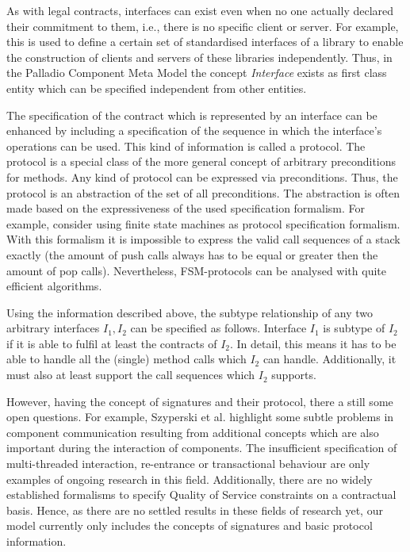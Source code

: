 As with legal contracts, interfaces can exist even when no one actually declared their commitment to them, i.e., there is no specific client or server. For example, this is used to define a certain set of standardised interfaces of a library to enable the construction of clients and servers of these libraries independently. Thus, in the Palladio Component Meta Model the concept \emph{Interface} exists as first class entity which can be specified independent from other entities.


The specification of the contract which is represented by an interface can be enhanced by including a specification of the sequence in which the interface's operations can be used. This kind of information is called a protocol. The protocol is a special class of the more general concept of arbitrary preconditions for methods. Any kind of protocol can be expressed via preconditions. Thus, the protocol is an abstraction of the set of all preconditions. The abstraction is often made based on the expressiveness of the used specification formalism. For example, consider using finite state machines as protocol specification formalism. With this formalism it is impossible to express the valid call sequences of a stack exactly (the amount of push calls always has to be equal or greater then the amount of pop calls). Nevertheless, FSM-protocols can be analysed with quite efficient algorithms. 

Using the information described above, the subtype relationship of any two arbitrary interfaces $I_1,I_2$ can be specified as follows. Interface $I_1$ is subtype of $I_2$ if it is able to fulfil at least the contracts of $I_2$. In detail, this means it has to be able to handle all the (single) method calls which $I_2$ can handle. Additionally, it must also at least support the call sequences which $I_2$ supports.


However, having the concept of signatures and their protocol, there a still some open questions. For example, Szyperski et al. \cite{szyperski2002a} highlight some subtle problems in component communication resulting from additional concepts which are also important during the interaction of components. The insufficient specification of multi-threaded interaction, re-entrance or transactional behaviour are only examples of ongoing research in this field. Additionally, there are no widely established formalisms to specify Quality of Service constraints on a contractual basis. Hence, as there are no settled results in these fields of research yet, our model currently only includes the concepts of signatures and basic protocol information.